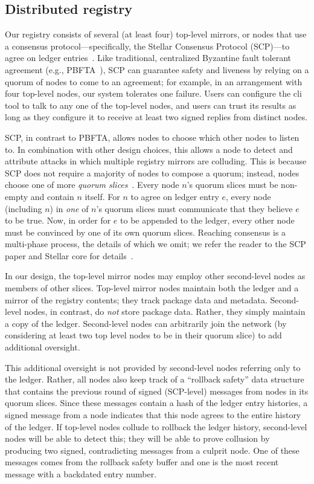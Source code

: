 \subsection{Distributed registry}
Our registry consists of several (at least four) top-level mirrors, or nodes
that use a consensus protocol---specifically, the Stellar Consensus Protocol
(SCP)---to agree on ledger entries~\cite{stellar}. Like traditional,
centralized Byzantine fault tolerant agreement (e.g., PBFTA~\cite{pbfts}), SCP
can guarantee safety and liveness by relying on a quorum of nodes to come to an
agreement; for example, in an arrangement with four top-level nodes, our system
tolerates one failure. Users can configure the \spam{} cli tool to talk to any
one of the top-level nodes, and users can trust its results as long as they
configure it to receive at least two signed replies from distinct nodes.

SCP, in contrast to PBFTA, allows nodes to choose which other nodes to listen
to. In combination with other design choices, this allows a node to detect and
attribute attacks in which multiple registry mirrors are colluding. This is
because SCP does not require a majority of nodes to compose a quorum; instead,
nodes choose one of more \emph{quorum slices}~\cite{stellar}. Every node $n$'s
quorum slices must be non-empty and contain $n$ itself. For $n$ to agree on
ledger entry $e$, every node (including $n$) in \emph{one} of $n$'s quorum
slices must communicate that they believe $e$ to be true. Now, in order for $e$
to be appended to the ledger, every other node must be convinced by one of its
own quorum slices. Reaching consensus is a multi-phase process, the details of
which we omit; we refer the reader to the SCP paper and Stellar core for
details~\cite{stellar,core}.

In our design, the top-level mirror nodes may employ other second-level nodes
as members of other slices. Top-level mirror nodes maintain both the ledger and
a mirror of the registry contents; they track package data and metadata.
Second-level nodes, in contrast, do \emph{not} store package data. Rather, they
simply maintain a copy of the ledger. Second-level nodes can arbitrarily join
the network (by considering at least two top level nodes to be in their quorum
slice) to add additional oversight.

This additional oversight is not provided by second-level nodes referring only
to the ledger. Rather, all nodes also keep track of a ``rollback safety'' data
structure that contains the previous round of signed (SCP-level) messages from
nodes in its quorum slices. Since these messages contain a hash of the ledger
entry histories, a signed message from a node indicates that this node agrees
to the entire history of the ledger. If top-level nodes collude to rollback the
ledger history, second-level nodes will be able to detect this; they will be
able to prove collusion by producing two signed, contradicting messages from a
culprit node. One of these messages comes from the rollback safety buffer and
one is the most recent message with a backdated entry number. 

